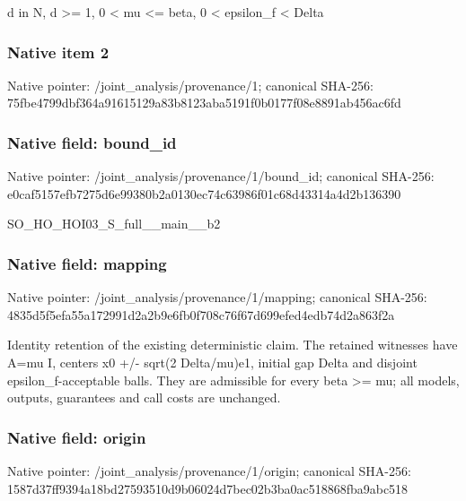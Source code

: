 \documentclass[10pt,a4paper]{article}
\begin{document}
\begingroup\raggedright\sloppy d in N,\allowbreak{} d >=\allowbreak{} 1,\allowbreak{} 0 < mu <=\allowbreak{} beta,\allowbreak{} 0 < epsilon\_\allowbreak{}f < Delta\par\endgroup

\subsubsection{Native item 2}
Native pointer: /joint\_\allowbreak{}analysis/provenance/1; canonical SHA-256: 75fbe4799dbf364a91615129a83b8123aba5191f0b0177f08e8891ab456ac6fd

\subsubsection{Native field: bound\_\allowbreak{}id}
Native pointer: /joint\_\allowbreak{}analysis/provenance/1/bound\_\allowbreak{}id; canonical SHA-256: e0caf5157efb7275d6e99380b2a0130ec74c63986f01c68d43314a4d2b136390

\begingroup\raggedright\sloppy SO\_\allowbreak{}HO\_\allowbreak{}HOI03\_\allowbreak{}S\_\allowbreak{}full\_\allowbreak{}\_\allowbreak{}main\_\allowbreak{}\_\allowbreak{}b2\par\endgroup

\subsubsection{Native field: mapping}
Native pointer: /joint\_\allowbreak{}analysis/provenance/1/mapping; canonical SHA-256: 4835d5f5efa55a172991d2a2b9e6fb0f708c76f67d699efed4edb74d2a863f2a

\begingroup\raggedright\sloppy Identity retention of the existing deterministic claim. The retained witnesses have A=\allowbreak{}mu I,\allowbreak{} centers x0 +/\allowbreak{}- sqrt(2 Delta/\allowbreak{}mu)e1,\allowbreak{} initial gap Delta and disjoint epsilon\_\allowbreak{}f-acceptable balls. They are admissible for every beta >=\allowbreak{} mu;\allowbreak{} all models,\allowbreak{} outputs,\allowbreak{} guarantees and call costs are unchanged.\par\endgroup

\subsubsection{Native field: origin}
Native pointer: /joint\_\allowbreak{}analysis/provenance/1/origin; canonical SHA-256: 1587d37ff9394a18bd27593510d9b06024d7bec02b3ba0ac518868fba9abc518
\end{document}
